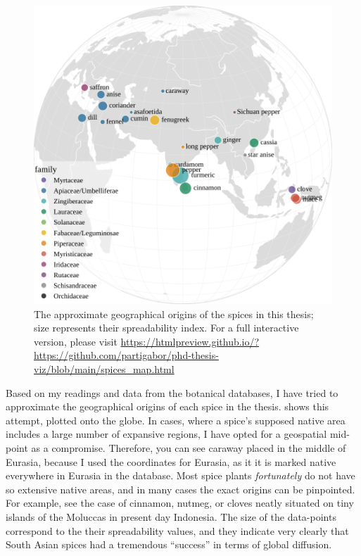 \begin{figure}[ht!]
  \includegraphics[width=\linewidth]{imgs/plots/spices_map.pdf}
  \caption{The approximate geographical origins of the spices in this thesis; size represents their spreadability index. For a full interactive version, please visit \url{https://htmlpreview.github.io/?https://github.com/partigabor/phd-thesis-viz/blob/main/spices_map.html}}
  \label{fig:spices_map}
\end{figure}



\noindent Based on my readings and data from the botanical databases, I have tried to approximate the geographical origins of each spice in the thesis.  shows this attempt, plotted onto the globe. In cases, where a spice's supposed native area includes a large number of expansive regions, I have opted for a geospatial mid-point as a compromise. Therefore, you can see caraway placed in the middle of Eurasia, because I used the coordinates for Eurasia, as it it is marked native everywhere in Eurasia in the database. Most spice plants \textit{fortunately} do not have so extensive native areas, and in many cases the exact origins can be pinpointed. For example, see the case of cinnamon, nutmeg, or cloves neatly situated on tiny islands of the Moluccas in present day Indonesia. %
The size of the data-points correspond to the their spreadability values, and they indicate very clearly that South Asian spices had a tremendous ``success'' in terms of global diffusion.


